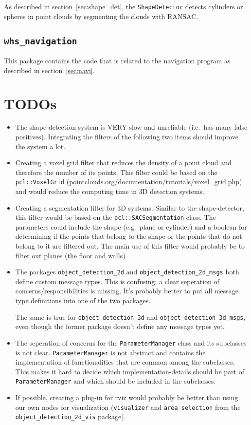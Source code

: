 \documentclass{article}
\newcommand{\code}[1]{\texttt{#1}}
\begin{document}
As described in section~\ref{sec:shape_det}, the \code{ShapeDetector}
detects cylinders or spheres in point clouds
by segmenting the clouds with RANSAC.


\subsection{\code{whs\_navigation}}
This package contains the code that is related to the navigation program
as described in section~\ref{sec:navi}.


\section{TODOs}
\label{sec:todos}

\begin{itemize}
	\item The shape-detection system is VERY slow and unreliable (i.e.\
		has many false positives).
		Integrating the filters of the following two items should
		improve the system a lot.
	\item Creating a voxel grid filter that reduces the density of a
		point cloud and therefore the number of its points.
		This filter could be based on the \code{pcl::VoxelGrid}
		(pointclouds.org/documentation/tutorials/voxel\_grid.php)
		and would reduce the computing time in 3D detection systems.
	\item Creating a segmentation filter for 3D systems.
		Similar to the shape-detector, this filter would be
		based on the \code{pcl::SACSegmentation} class.
		The parameters could include the shape (e.g.\ plane or cylinder)
		and a boolean for determining if the points that belong to the shape
		or the points that do not belong to it are filtered out.
		The main use of this filter would probably be to filter out planes
		(the floor and walls).
	\item The packages \code{object\_detection\_2d} and \code{object\_detection\_2d\_msgs}
		both define custom message types.
		This is confusing; a clear seperation of concerns/responsibilities is missing.
		It's probably better to put all message type definitions into one of the two
		packages.

		The same is true for \code{object\_detection\_3d} and
		\code{object\_detection\_3d\_msgs}, even though the former package
		doesn't define any message types yet.
	\item The seperation of concerns for the \code{ParameterManager} class and its
		subclasses is not clear.
		\code{ParameterManager} is not abstract and contains the implementation
		of functionalities that are common among the subclasses.
		This makes it hard to decide which implementation-details should
		be part of \code{ParameterManager} and which should be included in the
		subclasses.
	\item If possible, creating a plug-in for rviz would probably be better than
		using our own nodes for visualization
		(\code{visualizer} and \code{area\_selection} from the
		\code{object\_detection\_2d\_vis} package).
\end{itemize}
\end{document}
